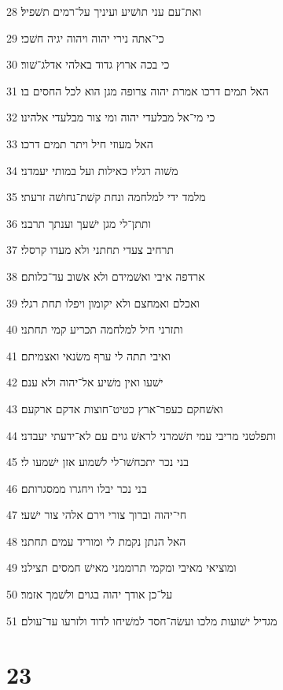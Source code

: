\par 28 ואת־עם עני תושׁיע ועיניך על־רמים תשׁפיל׃
\par 29 כי־אתה נירי יהוה ויהוה יגיה חשׁכי׃
\par 30 כי בכה ארוץ גדוד באלהי אדלג־שׁור׃
\par 31 האל תמים דרכו אמרת יהוה צרופה מגן הוא לכל החסים בו׃
\par 32 כי מי־אל מבלעדי יהוה ומי צור מבלעדי אלהינו׃
\par 33 האל מעוזי חיל ויתר תמים דרכו׃
\par 34 משׁוה רגליו כאילות ועל במותי יעמדני׃
\par 35 מלמד ידי למלחמה ונחת קשׁת־נחושׁה זרעתי׃
\par 36 ותתן־לי מגן ישׁעך וענתך תרבני׃
\par 37 תרחיב צעדי תחתני ולא מעדו קרסלי׃
\par 38 ארדפה איבי ואשׁמידם ולא אשׁוב עד־כלותם׃
\par 39 ואכלם ואמחצם ולא יקומון ויפלו תחת רגלי׃
\par 40 ותזרני חיל למלחמה תכריע קמי תחתני׃
\par 41 ואיבי תתה לי ערף משׂנאי ואצמיתם׃
\par 42 ישׁעו ואין משׁיע אל־יהוה ולא ענם׃
\par 43 ואשׁחקם כעפר־ארץ כטיט־חוצות אדקם ארקעם׃
\par 44 ותפלטני מריבי עמי תשׁמרני לראשׁ גוים עם לא־ידעתי יעבדני׃
\par 45 בני נכר יתכחשׁו־לי לשׁמוע אזן ישׁמעו לי׃
\par 46 בני נכר יבלו ויחגרו ממסגרותם׃
\par 47 חי־יהוה וברוך צורי וירם אלהי צור ישׁעי׃
\par 48 האל הנתן נקמת לי ומוריד עמים תחתני׃
\par 49 ומוציאי מאיבי ומקמי תרוממני מאישׁ חמסים תצילני׃
\par 50 על־כן אודך יהוה בגוים ולשׁמך אזמר׃
\par 51 מגדיל ישׁועות מלכו ועשׂה־חסד למשׁיחו לדוד ולזרעו עד־עולם׃

\chapter{23}

